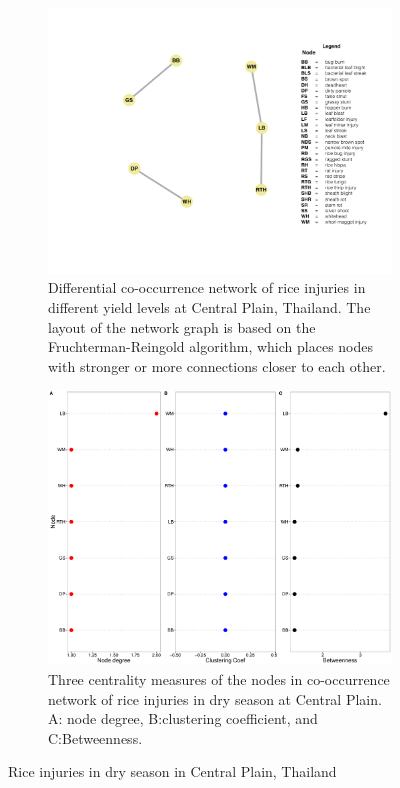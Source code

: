  \begin{figure}
    \centering
    \begin{subfigure}[b]{1\textwidth}
        \includegraphics[width = 1\textwidth]{figures/difyieldRR.pdf}
        \caption{Differential co-occurrence network of rice injuries in different yield levels at Central Plain, Thailand. The layout of the network graph is based on the Fruchterman-Reingold algorithm, which places nodes with stronger or more connections closer to each other.}
        \label{fig:difyieldRR}
    \end{subfigure}
    \begin{subfigure}[b]{1\textwidth}
        \includegraphics[width = 1\textwidth]{figures/yield_dif_nodepropRed_River_Delta.pdf}
        \caption{Three centrality measures of the nodes in co-occurrence network of rice injuries in dry season at Central Plain. A: node degree, B:clustering coefficient, and C:Betweenness.}
        \label{fig:nodepropdifyield_RR}
    \end{subfigure}
    \caption{Rice injuries in dry season in Central Plain, Thailand}
    \label{fig:CP_ds}
\end{figure}
 
